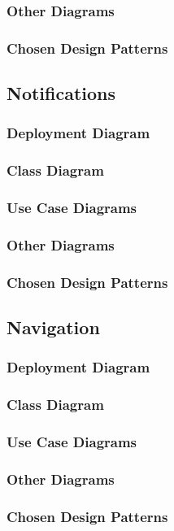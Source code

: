 \documentclass{article}
\begin{document}
        \subsubsection{Other Diagrams}
        \subsubsection{Chosen Design Patterns}
    \subsection{Notifications}
        \subsubsection{Deployment Diagram}
        \subsubsection{Class Diagram}
        \subsubsection{Use Case Diagrams}
        \subsubsection{Other Diagrams}
        \subsubsection{Chosen Design Patterns}
    \subsection{Navigation}
        \subsubsection{Deployment Diagram}
        \subsubsection{Class Diagram}
        \subsubsection{Use Case Diagrams}
        \subsubsection{Other Diagrams}
        \subsubsection{Chosen Design Patterns}
\end{document}
